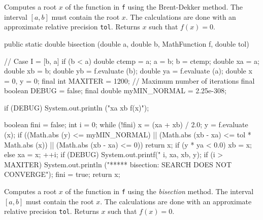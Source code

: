 \begin{tabb} Computes a root $x$ of the function in \texttt{f} using the
    Brent-Dekker method. The interval $[a, b]$ must contain the root $x$.
    The calculations are done with an approximate relative precision
    \texttt{tol}.  Returns $x$ such that $f(x) = 0$.
 \end{tabb}
\begin{htmlonly}
\end{htmlonly}
\begin{code}

   public static double bisection (double a, double b,
                                   MathFunction f, double tol)\begin{hide} {
      // Case I = [b, a]
      if (b < a) {
         double ctemp = a;
         a = b;
         b = ctemp;
      }
      double xa = a;
      double xb = b;
      double yb = f.evaluate (b);
      double ya = f.evaluate (a);
      double x = 0, y = 0;
      final int MAXITER = 1200;   // Maximum number of iterations
      final boolean DEBUG = false;
      final double myMIN_NORMAL = 2.25e-308;

      if (DEBUG)
         System.out.println
         ("\niter              xa                   xb              f(x)");

      boolean fini = false;
      int i = 0;
      while (!fini) {
         x = (xa + xb) / 2.0;
         y = f.evaluate (x);
         if ((Math.abs (y) <= myMIN_NORMAL) ||
             (Math.abs (xb - xa) <= tol * Math.abs (x)) ||
             (Math.abs (xb - xa) <= 0)) {
            return x;
         }
         if (y * ya < 0.0)
            xb = x;
         else
            xa = x;
         ++i;
         if (DEBUG)
            System.out.printf("%
                              i, xa, xb, y); 
         if (i > MAXITER) {
            System.out.println ("***** bisection:  SEARCH DOES NOT CONVERGE");
            fini = true;
         }
      }
      return x;
   }\end{hide}
\end{code}
\begin{tabb} Computes a root $x$ of the function in \texttt{f} using the
    \emph{bisection} method. The interval $[a, b]$ must contain the root $x$.
    The calculations are done with an approximate relative precision
    \texttt{tol}.  Returns $x$ such that $f(x) = 0$.
 \end{tabb}
\begin{htmlonly}
\end{htmlonly}

\begin{code}\begin{hide}
}\end{hide}
\end{code}
